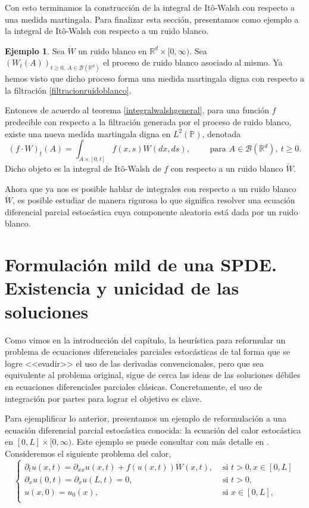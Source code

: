 \documentclass[letterpaper,twoside,12pt]{book}
\newcommand{\R}{\mathbb{R}}
\newcommand{\B}{\mathcal{B}}
\renewcommand{\P}{\mathbb{P}}
\newcommand{\W}{\dot{W}}
\newcommand{\1}{\mathds{1}}
\theoremstyle{definition}
\theoremstyle{definition}
\theoremstyle{remark}
\theoremstyle{definition}
\theoremstyle{definition}
\theoremstyle{definition}
\theoremstyle{definition}
\newtheorem{ejem}{Ejemplo}
\theoremstyle{definition}
\begin{document}
  Con esto terminamos la construcción de la integral de Itô-Walsh con respecto a una medida martingala. Para finalizar esta sección, presentamos como ejemplo a la integral de Itô-Walsh con respecto a un ruido blanco.
  \begin{ejem} 
   Sea $\dot W$ un ruido blanco en $\R^{d}\times [0,\infty)$. Sea $(W_t(A))_{t\geq0, \ A\in \B(\R^{d})}$ el proceso de ruido blanco asociado al mismo. Ya hemos visto que dicho proceso forma una medida martingala digna con respecto a la filtración \eqref{filtracionruidoblanco}. 

   Entonces de acuerdo al teorema \ref{integralwalshgeneral}, para una función $f$ predecible con respecto a la filtración generada por el proceso de ruido blanco, existe una nueva medida martingala digna en $L^2(\P)$, denotada 
   \[
   (f\cdot W)_t(A)=\int_{A\times [0,t]}f(x,s)W(dx,ds), \qquad \text{ para } A\in \B(\R^{d}), \ t\geq0.
   \]
   Dicho objeto es la integral de Itô-Walsh de $f$ con respecto a un ruido blanco $\dot W$.
   \end{ejem}
  
   Ahora que ya nos es posible hablar de integrales con respecto a un ruido blanco $\W$, es posible estudiar de manera rigurosa lo que significa resolver una  ecuación diferencial parcial estocástica cuya componente aleatoria está dada por un ruido blanco.

\section{Formulación mild de una SPDE. Existencia y unicidad de las soluciones}
Como vimos en la introducción del capítulo, la heurística para reformular un problema de ecuaciones diferenciales parciales estocásticas de tal forma que se logre <<evadir>> el uso de las derivadas convencionales, pero que sea equivalente al problema original, sigue de cerca las ideas de las soluciones débiles en ecuaciones diferenciales parciales clásicas. Concretamente, el uso de integración por partes para lograr el objetivo es clave. 

Para ejemplificar lo anterior, presentamos un ejemplo de reformulación a una ecuación diferencial parcial estocástica conocida: la ecuación del calor estocástica en $[0,L]\times[0,\infty)$. Este ejemplo se puede consultar con más detalle en \cite[pp. 23 - 32]{Khoshnevisan2009}. Consideremos el siguiente problema del calor,
\begin{equation}\label{calorejemplo}
   \begin{cases}
      \partial_tu(x,t)=\partial_{xx}u(x,t)+f(u(x,t))\W(x,t), & \text{ si } t>0, x\in [0,L]\\
      \partial_xu(0,t)=\partial_xu(L,t)=0, & \text{ si } t>0,\\
      u(x,0)=u_0(x), & \text{ si } x\in [0,L],\\
   \end{cases}
\end{equation}
\end{document}
